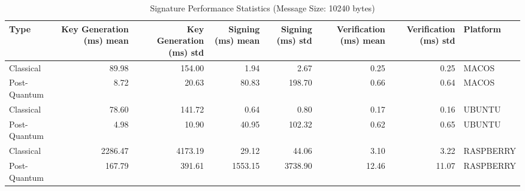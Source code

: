 \begin{table}
\caption{Signature Performance Statistics (Message Size: 10240 bytes)}
\label{tab:sig_platform_stats_10240}
\begin{tabular}{lrrrrrrl}
\toprule
Type & Key Generation (ms) mean & Key Generation (ms) std & Signing (ms) mean & Signing (ms) std & Verification (ms) mean & Verification (ms) std & Platform \\
\midrule
Classical & 89.98 & 154.00 & 1.94 & 2.67 & 0.25 & 0.25 & MACOS \\
Post-Quantum & 8.72 & 20.63 & 80.83 & 198.70 & 0.66 & 0.64 & MACOS \\
Classical & 78.60 & 141.72 & 0.64 & 0.80 & 0.17 & 0.16 & UBUNTU \\
Post-Quantum & 4.98 & 10.90 & 40.95 & 102.32 & 0.62 & 0.65 & UBUNTU \\
Classical & 2286.47 & 4173.19 & 29.12 & 44.06 & 3.10 & 3.22 & RASPBERRY \\
Post-Quantum & 167.79 & 391.61 & 1553.15 & 3738.90 & 12.46 & 11.07 & RASPBERRY \\
\bottomrule
\end{tabular}
\end{table}
